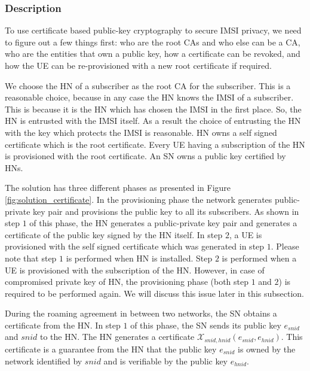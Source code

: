 \documentclass[12pt]{llncs}
\begin{document}
\subsubsection{Description}
To use certificate based public-key cryptography to secure IMSI privacy, we need to figure out a few things first: who are the root CAs and who else can be a CA, who are the entities that own a public key, how a certificate can be revoked, and how the UE can be re-provisioned with a new root certificate if required.

We choose the HN of a subscriber as the root CA for the subscriber. This is a reasonable choice, because in any case the HN knows the IMSI of a subscriber. This is because it is the HN which has chosen the IMSI in the first place. So, the HN is entrusted with the IMSI itself. As a result the choice of entrusting the HN with the key which protects the IMSI is reasonable. HN owns a self signed certificate which is the root certificate. Every UE having a subscription of the HN is provisioned with the root certificate. An SN owns a public key certified by HNs. 

The solution has three different phases as presented in Figure \ref{fig:solution_certificate}. In the provisioning phase the network generates public-private key pair and provisions the public key to all its subscribers. As shown in step $1$ of this phase, the HN generates a public-private key pair and generates a certificate of the public key signed by the HN itself.  In step $2$, a UE is provisioned with the self signed certificate which was generated in step $1$. Please note that step $1$ is performed when HN is installed. Step $2$ is performed when a UE is provisioned with the subscription of the HN. However, in case of compromised private key of HN, the provisioning phase (both step $1$ and $2$) is required to be performed again. We will discuss this issue later in this subsection. 

During the roaming agreement in between two networks, the SN obtains a certificate from the HN. In step $1$ of this phase, the SN sends its public key $e_{snid}$ and $snid$ to the HN. The HN generates a certificate $\mathcal{X}_{snid,hnid} (e_{snid},e_{hnid})$. This certificate is a guarantee from the HN that the public key $e_{snid}$ is owned by the network identified by $snid$ and is verifiable by the public key $e_{hnid}$.
\end{document}
